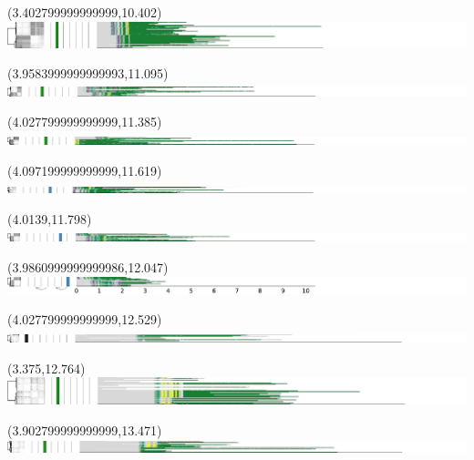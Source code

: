 \documentclass{article}
\begin{document}
\begin{textblock}{13}(3.402799999999999,10.402)\includegraphics{haplotypes-constrained/chr7-HG002.pdf}\end{textblock}
\begin{textblock}{13}(3.9583999999999993,11.095)\includegraphics{haplotypes-constrained/chr7-HG003.pdf}\end{textblock}
\begin{textblock}{13}(4.027799999999999,11.385)\includegraphics{haplotypes-constrained/chr7-HG004.pdf}\end{textblock}
\begin{textblock}{13}(4.097199999999999,11.619)\includegraphics{haplotypes-constrained/chr7-HG005.pdf}\end{textblock}
\begin{textblock}{13}(4.0139,11.798)\includegraphics{haplotypes-constrained/chr7-HG006.pdf}\end{textblock}
\begin{textblock}{13}(3.9860999999999986,12.047)\includegraphics{haplotypes-constrained/chr7-HG007.pdf}\end{textblock}
\begin{textblock}{13}(4.027799999999999,12.529)\includegraphics{haplotypes-constrained/chr8-HG001.pdf}\end{textblock}
\begin{textblock}{13}(3.375,12.764)\includegraphics{haplotypes-constrained/chr8-HG002.pdf}\end{textblock}
\begin{textblock}{13}(3.902799999999999,13.471)\includegraphics{haplotypes-constrained/chr8-HG003.pdf}\end{textblock}
\end{document}
